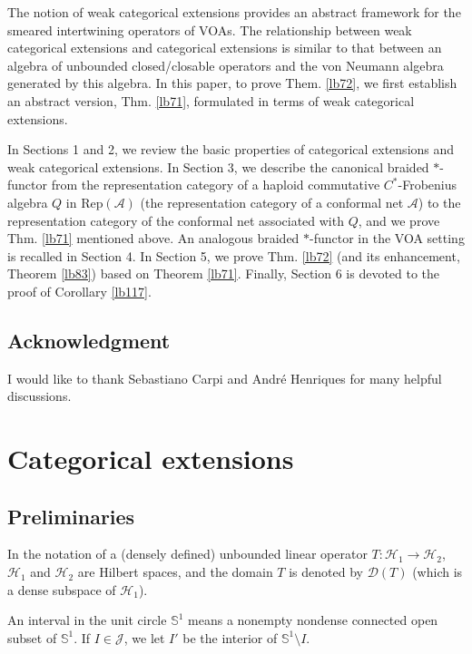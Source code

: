 \documentclass[11pt,b5paper,notitlepage]{article}
\theoremstyle{definition}
\theoremstyle{plain}
\newcommand{\mc}{\mathcal}
\newcommand{\Rep}{\mathrm{Rep}}
\newcommand{\Dom}{\scr D}
\newcommand{\scr}{\mathscr}
\newcommand{\Sbb}{{\mathbb S}}
\numberwithin{equation}{section}
\begin{document}
The notion of weak categorical extensions provides an abstract framework for the smeared intertwining operators of VOAs. The relationship between weak categorical extensions and categorical extensions is similar to that between an algebra of unbounded closed/closable operators and the von Neumann algebra generated by this algebra. In this paper, to prove Them. \ref{lb72}, we first establish an abstract version, Thm. \ref{lb71}, formulated in terms of weak categorical extensions.





In Sections 1 and 2, we review the basic properties of categorical extensions and weak categorical extensions. In Section 3, we describe the canonical braided $*$-functor from the representation category of a haploid commutative $C^*$-Frobenius algebra $Q$ in $\Rep(\mc A)$ (the representation category of a conformal net $\mc A$) to the representation category of the conformal net associated with $Q$, and we prove Thm. \ref{lb71} mentioned above. An analogous braided $*$-functor in the VOA setting is recalled in Section 4. In Section 5, we prove Thm. \ref{lb72} (and its enhancement, Theorem \ref{lb83}) based on Theorem \ref{lb71}. Finally, Section 6 is devoted to the proof of Corollary \ref{lb117}.



\subsection*{Acknowledgment}

I would like to thank Sebastiano Carpi and Andr\'e Henriques for many helpful discussions.




\section{Categorical extensions}\label{lb5}


\subsection{Preliminaries}\label{lb18}

In the notation of a (densely defined) unbounded linear operator $T:\mc H_1\rightarrow\mc H_2$, $\mc H_1$ and $\mc H_2$ are Hilbert spaces, and the domain $T$ is denoted by $\Dom(T)$ (which is a dense subspace of $\mc H_1$).

An interval in the unit circle $\Sbb^1$ means a nonempty nondense connected open subset of $\Sbb^1$. If $I\in\mc J$, we let $I'$ be the interior of $\Sbb^1\setminus I$.
\end{document}
